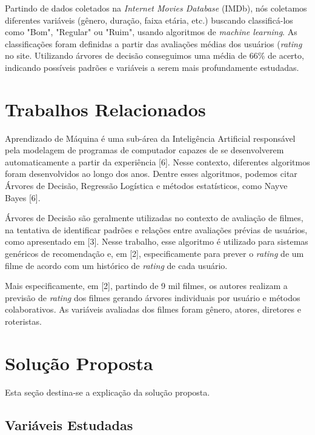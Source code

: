 \documentclass[twoside]{article}
\begin{document}
\begin{multicols}{2}
Partindo de dados coletados na \textit{Internet Movies Database} (IMDb), nós coletamos diferentes variáveis (gênero, duração, faixa etária, etc.) buscando classificá-los como "Bom", "Regular" ou "Ruim", usando algoritmos de \textit{machine learning}. As classificações foram definidas a partir das avaliações médias dos usuários (\textit{rating} no site. Utilizando árvores de decisão conseguimos uma média de 66\% de acerto, indicando possíveis padrões e variáveis a serem mais profundamente estudadas.


\section{Trabalhos Relacionados}

Aprendizado de Máquina é uma sub-área da Inteligência Artificial responsável pela modelagem de programas de computador capazes de se desenvolverem automaticamente a partir da experiência [6]. Nesse contexto, diferentes algoritmos foram desenvolvidos ao longo dos anos. Dentre esses algoritmos, podemos citar Árvores de Decisão, Regressão Logística e métodos estatísticos, como Nayve Bayes [6].

Árvores de Decisão são geralmente utilizadas no contexto de avaliação de filmes, na tentativa de identificar padrões e relações entre avaliações prévias de usuários, como apresentado em [3]. Nesse trabalho, esse algoritmo é utilizado para sistemas genéricos de recomendação e, em [2], especificamente para prever o \textit{rating} de um filme de acordo com um histórico de \textit{rating} de cada usuário.

Mais especificamente, em [2], partindo de 9 mil filmes, os autores realizam a previsão de \textit{rating} dos filmes gerando árvores individuais por usuário e métodos colaborativos. As variáveis avaliadas dos filmes foram gênero, atores, diretores e roteristas.


\section{Solução Proposta}

Esta seção destina-se a explicação da solução proposta.

\subsection{Variáveis Estudadas}


\end{multicols}
\end{document}
